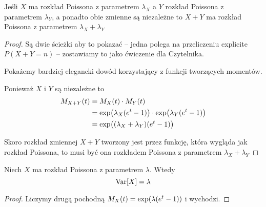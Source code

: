 \begin{theorem}[Lemat 5.2 P\&C]
	Jeśli \( X \) ma rozkład Poissona z parametrem \( \lambda_X \) a \( Y \) rozkład Poissona z parametrem \( \lambda_Y \), a ponadto obie zmienne są niezależne to \( X + Y \) ma rozkład Poissona z parametrem \( \lambda_X + \lambda_Y\)
\end{theorem}
\begin{proof}
	Są dwie ścieżki aby to pokazać -- jedna polega na przeliczeniu explicite \( P(X + Y = n) \) -- zostawiamy to jako ćwiczenie dla Czytelnika.

	Pokażemy bardziej elegancki dowód korzystający z funkcji tworzących momentów.

	Ponieważ \( X \) i \( Y \) są niezależne to
	\begin{align*}
		M_{X + Y}(t)
		 & = M_X(t) \cdot M_Y(t)                                               \\
		 & = \exp\pars{\lambda_X(e^t - 1)} \cdot \exp\pars{\lambda_Y(e^t - 1)} \\
		 & = \exp\pars{(\lambda_X + \lambda_Y)(e^t - 1)}
	\end{align*}

	Skoro rozkład zmiennej \( X + Y \) tworzony jest przez funkcję, która wygląda jak rozkład Poissona, to musi być ona rozkładem Poissona z parametrem \( \lambda_X + \lambda_Y \)
\end{proof}
\begin{theorem}
	\label{poisson-variable-variance}
	Niech \( X \) ma rozkład Poissona z parametrem \( \lambda \). Wtedy
	\[
		\variance{X} = \lambda
	\]
\end{theorem}
\begin{proof}
	Liczymy drugą pochodną \( M_X(t) = \exp\pars{\lambda \pars{e^t - 1}} \) i wychodzi.
\end{proof}